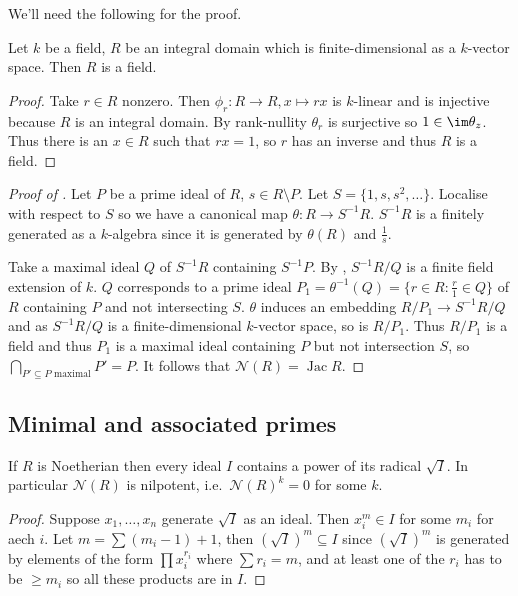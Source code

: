 \documentclass[a4paper]{article}
\newcommand{\nilrad}[1]{\mathcal{N}({#1})} %
\DeclareMathOperator{\jac}{Jac} %
\begin{document}
We'll need the following for the proof.
\begin{lemma}
  Let \(k\) be a field, \(R\) be an integral domain which is finite-dimensional as a \(k\)-vector space. Then \(R\) is a field.
\end{lemma}

\begin{proof}
  Take \(r \in R\) nonzero. Then \(\phi_r: R \to R, x \mapsto rx\) is \(k\)-linear and is injective because \(R\) is an integral domain. By rank-nullity \(\theta_r\) is surjective so \(1 \in \im \theta_z\). Thus there is an \(x \in R\) such that \(rx = 1\), so \(r\) has an inverse and thus \(R\) is a field.
\end{proof}

\begin{proof}[Proof of ]
  Let \(P\) be a prime ideal of \(R\), \(s \in R \setminus P\). Let \(S = \{1, s, s^2, \dots \}\). Localise with respect to \(S\) so we have a canonical map \(\theta: R \to S^{-1}R\). \(S^{-1}R\) is a finitely generated as a \(k\)-algebra since it is generated by \(\theta(R)\) and \(\frac{1}{s}\).

  Take a maximal ideal \(Q\) of \(S^{-1}R\) containing \(S^{-1}P\). By , \(S^{-1}R/Q\) is a finite field extension of \(k\). \(Q\) corresponds to a prime ideal \(P_1 = \theta^{-1}(Q) = \{r \in R: \frac{r}{1} \in Q\}\) of \(R\) containing \(P\) and not intersecting \(S\). \(\theta\) induces an embedding \(R/P_1 \to S^{-1}R/Q\) and as \(S^{-1}R/Q\) is a finite-dimensional \(k\)-vector space, so is \(R/P_1\). Thus \(R/P_1\) is a field and thus \(P_1\) is a maximal ideal containing \(P\) but not intersection \(S\), so \(\bigcap_{P' \subseteq P \text{ maximal}} P' = P\). It follows that \(\nilrad R = \jac R\).
\end{proof}

\subsection{Minimal and associated primes}

\begin{lemma}
  If \(R\) is Noetherian then every ideal \(I\) contains a power of its radical \(\sqrt I\). In particular \(\nilrad R\) is nilpotent, i.e.\ \(\nilrad R^k = 0\) for some \(k\).
\end{lemma}

\begin{proof}
  Suppose \(x_1, \dots, x_n\) generate \(\sqrt I\) as an ideal. Then \(x_i^m \in I\) for some \(m_i\) for aech \(i\). Let \(m = \sum (m_i - 1) + 1\), then \((\sqrt I)^m \subseteq I\) since \((\sqrt I)^m\) is generated by elements of the form \(\prod x_i^{r_i}\) where \(\sum r_i = m\), and at least one of the \(r_i\) has to be \(\geq m_i\) so all these products are in \(I\).
\end{proof}
\end{document}

